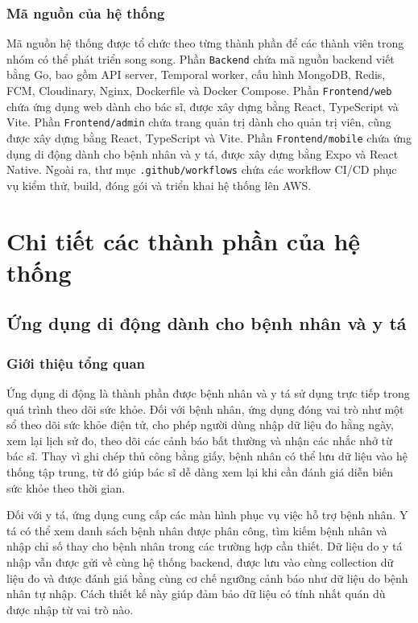 \subsubsection{Mã nguồn của hệ thống}
\par Mã nguồn hệ thống được tổ chức theo từng thành phần để các thành viên trong nhóm có thể phát triển song song. Phần \texttt{Backend} chứa mã nguồn backend viết bằng Go, bao gồm API server, Temporal worker, cấu hình MongoDB, Redis, FCM, Cloudinary, Nginx, Dockerfile và Docker Compose. Phần \texttt{Frontend/web} chứa ứng dụng web dành cho bác sĩ, được xây dựng bằng React, TypeScript và Vite. Phần \texttt{Frontend/admin} chứa trang quản trị dành cho quản trị viên, cũng được xây dựng bằng React, TypeScript và Vite. Phần \texttt{Frontend/mobile} chứa ứng dụng di động dành cho bệnh nhân và y tá, được xây dựng bằng Expo và React Native. Ngoài ra, thư mục \texttt{.github/workflows} chứa các workflow CI/CD phục vụ kiểm thử, build, đóng gói và triển khai hệ thống lên AWS.

\section{Chi tiết các thành phần của hệ thống}

\subsection{Ứng dụng di động dành cho bệnh nhân và y tá}

\subsubsection{Giới thiệu tổng quan}
\par Ứng dụng di động là thành phần được bệnh nhân và y tá sử dụng trực tiếp trong quá trình theo dõi sức khỏe. Đối với bệnh nhân, ứng dụng đóng vai trò như một sổ theo dõi sức khỏe điện tử, cho phép người dùng nhập dữ liệu đo hằng ngày, xem lại lịch sử đo, theo dõi các cảnh báo bất thường và nhận các nhắc nhở từ bác sĩ. Thay vì ghi chép thủ công bằng giấy, bệnh nhân có thể lưu dữ liệu vào hệ thống tập trung, từ đó giúp bác sĩ dễ dàng xem lại khi cần đánh giá diễn biến sức khỏe theo thời gian.

\par Đối với y tá, ứng dụng cung cấp các màn hình phục vụ việc hỗ trợ bệnh nhân. Y tá có thể xem danh sách bệnh nhân được phân công, tìm kiếm bệnh nhân và nhập chỉ số thay cho bệnh nhân trong các trường hợp cần thiết. Dữ liệu do y tá nhập vẫn được gửi về cùng hệ thống backend, được lưu vào cùng collection dữ liệu đo và được đánh giá bằng cùng cơ chế ngưỡng cảnh báo như dữ liệu do bệnh nhân tự nhập. Cách thiết kế này giúp đảm bảo dữ liệu có tính nhất quán dù được nhập từ vai trò nào.


